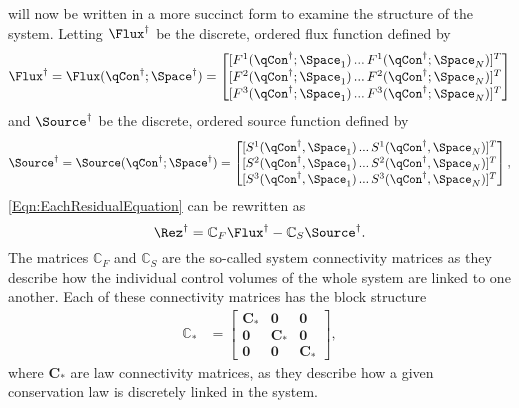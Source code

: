  will now be written in a more succinct form to examine the structure of the system.
Letting $\Flux^\dagger$ be the discrete, ordered flux function defined by
\begin{equation}
    \Flux^\dagger = \Flux(\qCon^\dagger;\Space^\dagger) =
    \begin{bmatrix}
        [F^1(\qCon^\dagger;\Space_1)\,...\,F^1(\qCon^\dagger;\Space_N)]^T \\
        [F^2(\qCon^\dagger;\Space_1)\,...\,F^2(\qCon^\dagger;\Space_N)]^T \\
        [F^3(\qCon^\dagger;\Space_1)\,...\,F^3(\qCon^\dagger;\Space_N)]^T 
    \end{bmatrix}
\end{equation}
and $\Source^\dagger$ be the discrete, ordered source function defined by
\begin{equation}
    \Source^\dagger = \Source(\qCon^\dagger;\Space^\dagger) =
    \begin{bmatrix}
        [S^1(\qCon^\dagger,\Space_1)\,...\,S^1(\qCon^\dagger,\Space_N)]^T \\
        [S^2(\qCon^\dagger,\Space_1)\,...\,S^2(\qCon^\dagger,\Space_N)]^T \\
        [S^3(\qCon^\dagger,\Space_1)\,...\,S^3(\qCon^\dagger,\Space_N)]^T
    \end{bmatrix},
\end{equation}
\cref{Eqn:EachResidualEquation} can be rewritten as
\begin{equation}
    \Rez^\dagger = \mathbb{C}_F \Flux^\dagger - \mathbb{C}_S \Source^\dagger.
\end{equation}
The matrices $\mathbb{C}_F$ and $\mathbb{C}_S$ are the so-called system connectivity matrices as they describe how the individual control volumes  of the whole system are linked to one another.  Each of these connectivity matrices has the block structure
\begin{align}
    \mathbb{C}_* &=  \begin{bmatrix}
                        \mathbf{C}_* & \mathbf{0}   & \mathbf{0} \\
                        \mathbf{0}   & \mathbf{C}_* & \mathbf{0} \\
                        \mathbf{0}   & \mathbf{0}   & \mathbf{C}_* 
                     \end{bmatrix},
    \label{Eqn:SysConnMatrices}
\end{align}
where $\mathbf{C}_*$ are law connectivity matrices, as they describe how a given conservation law is discretely linked in the system.
